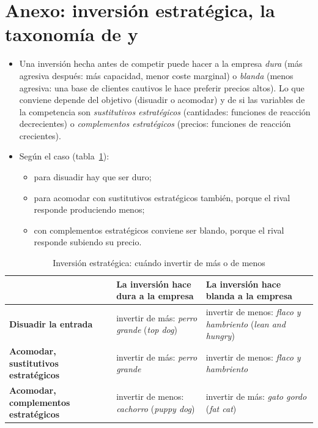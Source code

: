\documentclass[11pt]{article}
\begin{document}
\section{Anexo: inversión estratégica,\cortetitulo{} la taxonomía de  y }\label{anexo:taxonomia}

\begin{itemize}
\item Una inversión hecha antes de competir puede hacer a la empresa \emph{dura} (más agresiva después: más capacidad, menor coste marginal) o \emph{blanda} (menos agresiva: una base de clientes cautivos le hace preferir precios altos). Lo que conviene depende del objetivo (disuadir o acomodar) y de si las variables de la competencia son \emph{sustitutivos estratégicos} (cantidades: funciones de reacción decrecientes) o \emph{complementos estratégicos} (precios: funciones de reacción crecientes)\nocite{FudenbergTirole1984Fat}.
\item Según el caso (tabla~\ref{tab:taxonomia}):
  \begin{itemize}
  \item para disuadir hay que ser duro;
  \item para acomodar con sustitutivos estratégicos también, porque el rival responde produciendo menos;
  \item con complementos estratégicos conviene ser blando, porque el rival responde subiendo su precio.
  \end{itemize}
\end{itemize}

\begin{table}[H]
\centering
\caption{Inversión estratégica: cuándo invertir de más o de menos}\label{tab:taxonomia}
\begin{tabular}{>{\raggedright\arraybackslash}m{4.2cm}>{\centering\arraybackslash}m{5cm}>{\centering\arraybackslash}m{5cm}}
\toprule
\rowcolor{tceeazulpalido} & \textbf{La inversión hace dura a la empresa} & \textbf{La inversión hace blanda a la empresa}\\
\midrule
\textbf{Disuadir la entrada} & invertir de más: \emph{perro grande} (\emph{top dog}) & invertir de menos: \emph{flaco y hambriento} (\emph{lean and hungry})\\
\addlinespace[0.3em]
\textbf{Acomodar, sustitutivos estratégicos} & invertir de más: \emph{perro grande} & invertir de menos: \emph{flaco y hambriento}\\
\addlinespace[0.3em]
\textbf{Acomodar, complementos estratégicos} & invertir de menos: \emph{cachorro} (\emph{puppy dog}) & invertir de más: \emph{gato gordo} (\emph{fat cat})\\
\bottomrule
\end{tabular}
\end{table}
\end{document}
